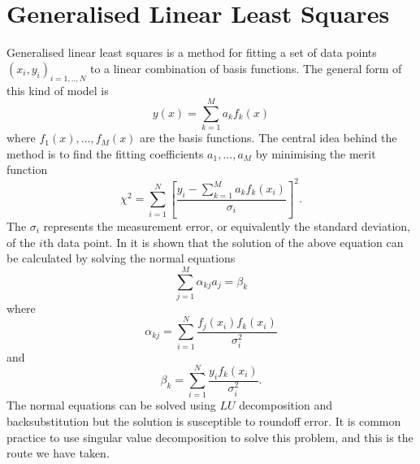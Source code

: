 \section{Generalised Linear Least Squares}
Generalised linear least squares is a method for fitting a set of data
points $(x_i, y_i)_{i=1,..,N}$ to a linear combination of basis
functions. The general form of this kind of model is
\begin{equation}
y(x) = \sum_{k=1}^M a_k f_k(x)
\end{equation}
where $f_1(x),...,f_M(x)$ are the basis functions. The central idea
behind the method is to find the fitting coefficients $a_1,...,a_M$ by
minimising the merit function
\begin{equation}
\chi^2 = \sum_{i=1}^N \left[\frac{y_i-\sum_{k=1}^M a_k f_k(x_i)}{\sigma_i}\right]^2.
\end{equation}
The $\sigma_i$ represents the measurement error, or equivalently the
standard deviation, of the $i$th data point. In \cite{book:PRESS} it
is shown that the solution of the above equation can be calculated by
solving the normal equations
\begin{equation}
\sum_{j=1}^M \alpha_{kj} a_j = \beta_k
\end{equation}
where
\begin{equation}
\alpha_{kj} = \sum_{i=1}^N \frac{f_j(x_i)f_k(x_i)}{\sigma_i^2}
\end{equation}
and
\begin{equation}
\beta_k = \sum_{i=1}^N \frac{y_i f_k(x_i)}{\sigma_i^2}.
\end{equation}
The normal equations can be solved using $LU$ decomposition and
backsubstitution but the solution is susceptible to roundoff error. It
is common practice to use singular value decomposition to solve this
problem, and this is the route we have taken.

